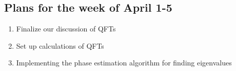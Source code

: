 \documentclass[%
oneside,                 %
final,                   %
10pt]{article}
\begin{document}
\subsection{Plans for the week of April 1-5}

\begin{enumerate}
\item Finalize our discussion of QFTs

\item Set up calculations of QFTs

\item Implementing the phase estimation algorithm for finding eigenvalues
\end{enumerate}

\noindent


\end{document}
